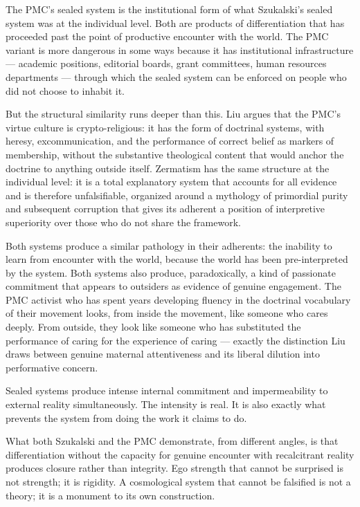 \documentclass[11pt, a4paper]{article}
\theoremstyle{named}
\begin{document}
The PMC's sealed system is the institutional form of what Szukalski's
sealed system was at the individual level. Both are products of
differentiation that has proceeded past the point of productive
encounter with the world. The PMC variant is more dangerous in some
ways because it has institutional infrastructure — academic positions,
editorial boards, grant committees, human resources departments —
through which the sealed system can be enforced on people who did not
choose to inhabit it.

But the structural similarity runs deeper than this. Liu argues that
the PMC's virtue culture is crypto-religious: it has the form of
doctrinal systems, with heresy, excommunication, and the performance
of correct belief as markers of membership, without the substantive
theological content that would anchor the doctrine to anything
outside itself. Zermatism has the same structure at the individual
level: it is a total explanatory system that accounts for all evidence
and is therefore unfalsifiable, organized around a mythology of
primordial purity and subsequent corruption that gives its adherent
a position of interpretive superiority over those who do not share
the framework.

Both systems produce a similar pathology in their adherents: the
inability to learn from encounter with the world, because the world
has been pre-interpreted by the system. Both systems also produce,
paradoxically, a kind of passionate commitment that appears to
outsiders as evidence of genuine engagement. The PMC activist who
has spent years developing fluency in the doctrinal vocabulary of
their movement looks, from inside the movement, like someone who
cares deeply. From outside, they look like someone who has
substituted the performance of caring for the experience of caring
— exactly the distinction Liu draws between genuine maternal
attentiveness and its liberal dilution into performative concern.

\begin{keybox}
Sealed systems produce intense internal commitment and impermeability
to external reality simultaneously. The intensity is real. It is also
exactly what prevents the system from doing the work it claims to do.
\end{keybox}

What both Szukalski and the PMC demonstrate, from different angles,
is that differentiation without the capacity for genuine encounter
with recalcitrant reality produces closure rather than integrity.
Ego strength that cannot be surprised is not strength; it is rigidity.
A cosmological system that cannot be falsified is not a theory; it
is a monument to its own construction.
\end{document}
